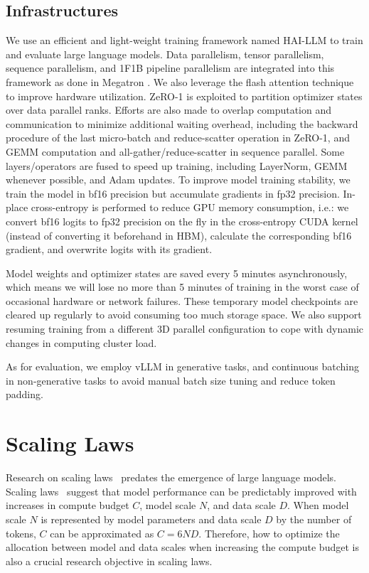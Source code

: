 \subsection{Infrastructures}
We use an efficient and light-weight training framework named HAI-LLM \citep{haillm} to train and evaluate large language models. Data parallelism, tensor parallelism, sequence parallelism, and 1F1B pipeline parallelism are integrated into this framework as done in Megatron \citep{megatron, megatron2, megatron3}. We also leverage the flash attention \citep{dao2022flashattention, dao2023flashattention2} technique to improve hardware utilization. ZeRO-1 \citep{zero} is exploited to partition optimizer states over data parallel ranks. Efforts are also made to overlap computation and communication to minimize additional waiting overhead, including the backward procedure of the last micro-batch and reduce-scatter operation in ZeRO-1, and GEMM computation and all-gather/reduce-scatter in sequence parallel. Some layers/operators are fused to speed up training, including LayerNorm, GEMM whenever possible, and Adam updates. To improve model training stability, we train the model in bf16 precision but accumulate gradients in fp32 precision. In-place cross-entropy is performed to reduce GPU memory consumption, i.e.: we convert bf16 logits to fp32 precision on the fly in the cross-entropy CUDA kernel (instead of converting it beforehand in HBM), calculate the corresponding bf16 gradient, and overwrite logits with its gradient.

Model weights and optimizer states are saved every 5 minutes asynchronously, which means we will lose no more than 5 minutes of training in the worst case of occasional hardware or network failures. These temporary model checkpoints are cleared up regularly to avoid consuming too much storage space. We also support resuming training from a different 3D parallel configuration to cope with dynamic changes in computing cluster load.

As for evaluation, we employ vLLM \citep{vllm} in generative tasks, and continuous batching in non-generative tasks to avoid manual batch size tuning and reduce token padding.

\section{Scaling Laws}
\label{sec:scaling}
Research on scaling laws~\citep{hestness2017deep} predates the emergence of large language models. Scaling laws~\citep{scalinglaw,henighan2020scaling,chinchilla} suggest that model performance can be predictably improved with increases in compute budget $C$, model scale $N$, and data scale $D$. When model scale $N$ is represented by model parameters and data scale $D$ by the number of tokens, $C$ can be approximated as $C=6ND$. Therefore, how to optimize the allocation between model and data scales when increasing the compute budget is also a crucial research objective in scaling laws.

